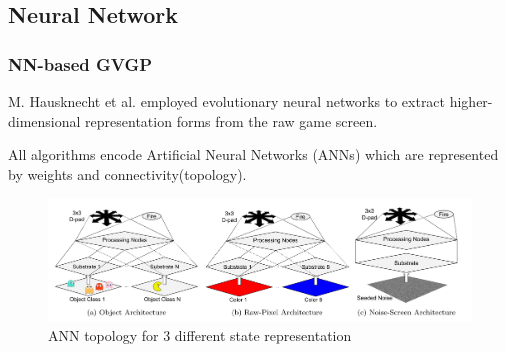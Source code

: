 \documentclass{beamer}
\begin{document}
\subsection{Neural Network}
\begin{frame}
\frametitle{NN-based GVGP}
M. Hausknecht et al. \cite{5} employed evolutionary neural networks to extract higher-dimensional representation forms from the raw game screen.

All algorithms encode Artificial Neural Networks (ANNs) which are represented by weights and connectivity(topology).
\begin{figure}
  \includegraphics[width=1\linewidth]{figures/m1p1}
  \caption{ANN topology for 3 different state representation}
\end{figure}
\end{frame}
\end{document}
